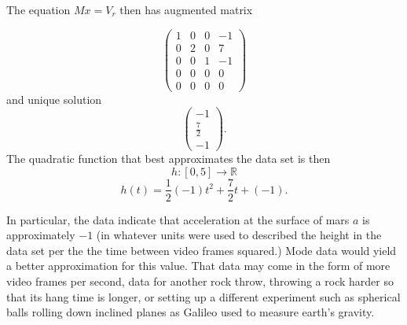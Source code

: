 \documentclass[12pt]{article}
\def\R{{\mathbb{R}}}
\def\bv{\left(\begin{array}{c}}
\def\ev{\end{array}\right) }
\begin{document}
The equation $Mx=V_r$ then has augmented matrix 

\[
\left( \begin{array}{rrr|r}
1 &0&0&-1\\
0      &2&0&7\\
0&0&1&-1\\
0&0&0&0\\
0&0&0&0
\end{array} \right)
\]
and unique solution 
\[\bv -1\\ \frac72 \\-1 \ev. \]
The quadratic function that best approximates the data set is then 
\[ h:[0,5] \to \R\]
\[h(t)=\frac12 (-1) t^2 +\frac72 t +(-1).\]

In particular, the data indicate that acceleration at the surface of mars $a$ is approximately $-1$ (in whatever units were used to described the height in the data set per the the time between video frames squared.) Mode data would yield a better approximation for this value. That data may come in the form of more video frames per second, data for another rock throw, throwing a rock harder so that its hang time is longer, or setting up a different experiment such as spherical balls rolling down inclined planes as Galileo used to measure earth's gravity. 
\end{document}
